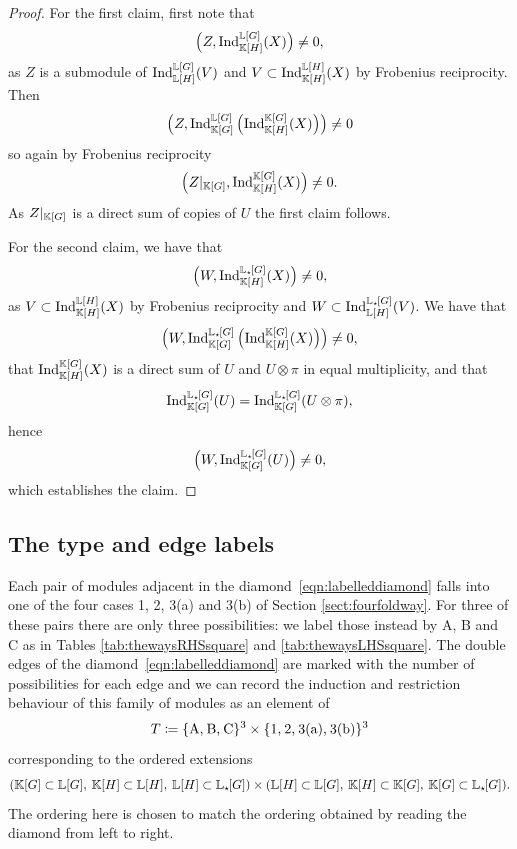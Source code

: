 \begin{proof}
    For the first claim, first note that
    \[
    \left(Z, \operatorname{Ind}_{{\mathbb K}[H]}^{{\mathbb L}[G]}(X)\right) \neq 0,
    \]
    as $Z$ is a submodule of $\operatorname{Ind}_{{\mathbb L}[H]}^{{\mathbb L}[G]}(V)$ and $V \subset \operatorname{Ind}_{{\mathbb K}[H]}^{{\mathbb L}[H]}(X)$ by Frobenius reciprocity. Then 
    \[
        \left(Z, \operatorname{Ind}_{{\mathbb K}[G]}^{{\mathbb L}[G]}\left(\operatorname{Ind}_{{\mathbb K}[H]}^{{\mathbb K}[G]}(X)\right) \right) \neq 0
    \]
    so again by Frobenius reciprocity
    \[
    \left(Z|_{{\mathbb K}[G]}, \operatorname{Ind}_{{\mathbb K}[H]}^{{\mathbb K}[G]}(X)\right) \neq 0.
    \]
    As $Z|_{{\mathbb K}[G]}$ is a direct sum of copies of $U$ the first claim follows.

    For the second claim, we have that
    \[
    \left(W, \operatorname{Ind}_{{\mathbb K}[H]}^{{\mathbb L}_{\star \hspace{-0.1em}}[G]}(X)\right) \neq 0,
    \]
    as $V \subset \operatorname{Ind}_{{\mathbb K}[H]}^{{\mathbb L}[H]}(X)$ by Frobenius reciprocity and $W \subset \operatorname{Ind}_{{\mathbb L}[H]}^{{\mathbb L}_{\star \hspace{-0.1em}}[G]}(V)$. We have that
    \[
        \left(W, \operatorname{Ind}_{{\mathbb K}[G]}^{{\mathbb L}_{\star \hspace{-0.1em}}[G]}\left(\operatorname{Ind}_{{\mathbb K}[H]}^{{\mathbb K}[G]}(X)\right) \right) \neq 0,
    \]
    that $\operatorname{Ind}_{{\mathbb K}[H]}^{{\mathbb K}[G]}(X)$ is a direct sum of $U$ and $U \otimes \pi$ in equal multiplicity, and that
    \[
    \operatorname{Ind}_{{\mathbb K}[G]}^{{\mathbb L}_{\star \hspace{-0.1em}}[G]}(U) = \operatorname{Ind}_{{\mathbb K}[G]}^{{\mathbb L}_{\star \hspace{-0.1em}}[G]}(U \otimes \pi),
    \]
    hence
    \[
    \left(W, \operatorname{Ind}_{{\mathbb K}[G]}^{{\mathbb L}_{\star \hspace{-0.1em}}[G]}(U) \right) \neq 0,
    \]
    which establishes the claim.
\end{proof}

\subsection{The type and edge labels}
Each pair of modules adjacent in the diamond~\eqref{eqn:labelleddiamond} falls into one of the four cases 1, 2, 3(a) and 3(b) of Section \ref{sect:fourfoldway}. For three of these pairs there are only three possibilities: we label those instead by A, B and C as in Tables \ref{tab:thewaysRHSsquare} and \ref{tab:thewaysLHSsquare}. The double edges of the diamond~\eqref{eqn:labelleddiamond} are marked with the number of possibilities for each edge
and
we can record the induction and restriction behaviour of this family of modules as an element of
\[
T \coloneqq \{\text{A,\:B,\:C}\}^3 \times \{\text{1,\:2,\:3(a),\:3(b)}\}^3
\]
corresponding to the ordered extensions
\[
({\mathbb K}[G] \subset {\mathbb L}[G], \: {\mathbb K}[H] \subset {\mathbb L}[H], \: {\mathbb L}[H] \subset {\mathbb L}_{\star \hspace{-0.1em}}[G]) \times ({\mathbb L}[H] \subset {\mathbb L}[G], \: {\mathbb K}[H] \subset {\mathbb K}[G], \: {\mathbb K}[G] \subset {\mathbb L}_{\star \hspace{-0.1em}}[G]).
\]
The ordering here is chosen to match the ordering obtained by reading the diamond from left to right.

